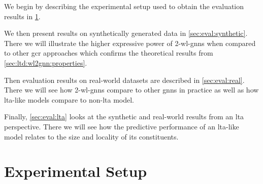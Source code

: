 \begin{enumerate*}[label={\circled{\small\arabic*}}]
	\item We begin by describing the experimental setup used to obtain the evaluation results in \cref{sec:eval:setup}.
	\item We then present results on synthetically generated data in \cref{sec:eval:synthetic}.
	 	There we will illustrate the higher expressive power of 2-\acs{wl}-\acsp{gnn} when compared to other \ac{gcr} approaches which confirms the theoretical results from \cref{sec:ltd:wl2gnn:properties}.
	\item Then evaluation results on real-world datasets are described in \cref{sec:eval:real}.
		There we will see how 2-\acs{wl}-\acsp{gnn} compare to other \acp{gnn} in practice as well as how \acs{lta}-like models compare to non-\acs{lta} model.
	\item Finally, \cref{sec:eval:lta} looks at the synthetic and real-world results from an \ac{lta} perspective.
		There we will see how the predictive performance of an \acs{lta}-like model relates to the size and locality of its constituents.
\end{enumerate*}

\section{Experimental Setup}%
\label{sec:eval:setup}

